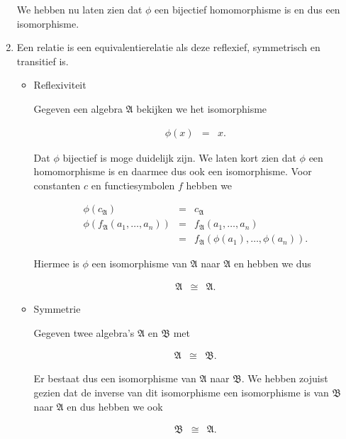 \documentclass[a4paper,11pt]{article}
\begin{document}
\begin{enumerate}
We hebben nu laten zien dat $\phi$ een bijectief homomorphisme is en dus een isomorphisme.

\item %

Een relatie is een equivalentierelatie als deze reflexief, symmetrisch en
transitief is.

\begin{itemize}

\item{Reflexiviteit}

Gegeven een algebra $\mathfrak{A}$ bekijken we het isomorphisme

\begin{eqnarray*}
\phi(x) & = & x.
\end{eqnarray*}

Dat $\phi$ bijectief is moge duidelijk zijn. We laten kort zien dat $\phi$ een
homomorphisme is en daarmee dus ook een isomorphisme. Voor constanten $c$ en
functiesymbolen $f$ hebben we

\begin{eqnarray*}
\phi(c_{\mathfrak{A}})                       & = & c_{\mathfrak{A}} \\
\phi(f_{\mathfrak{A}}(a_{1}, \ldots, a_{n})) & = & f_{\mathfrak{A}}(a_{1}, \ldots, a_{n}) \\
                                             & = & f_{\mathfrak{A}}(\phi(a_{1}), \ldots, \phi(a_{n})).
\end{eqnarray*}

Hiermee is $\phi$ een isomorphisme van $\mathfrak{A}$ naar $\mathfrak{A}$ en
hebben we dus

\begin{eqnarray*}
\mathfrak{A} & \cong & \mathfrak{A}.
\end{eqnarray*}

\item{Symmetrie}

Gegeven twee algebra's $\mathfrak{A}$ en $\mathfrak{B}$ met

\begin{eqnarray*}
\mathfrak{A} & \cong & \mathfrak{B}.
\end{eqnarray*}

Er bestaat dus een isomorphisme van $\mathfrak{A}$ naar $\mathfrak{B}$. We
hebben zojuist gezien dat de inverse van dit isomorphisme een isomorphisme is
van $\mathfrak{B}$ naar $\mathfrak{A}$ en dus hebben we ook

\begin{eqnarray*}
\mathfrak{B} & \cong & \mathfrak{A}.
\end{eqnarray*}


\end{itemize}
\end{enumerate}
\end{document}
